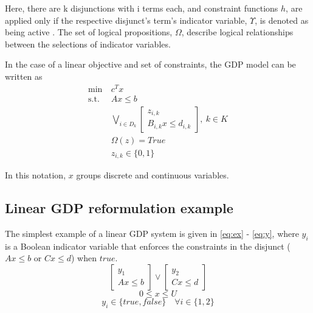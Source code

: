 \documentclass{juliacon}
\begin{document}
Here, there are k disjunctions with i terms each, and constraint functions $h$, are applied only if the respective disjunct's term's indicator variable, $\Upsilon$, is denoted as being active \cite{chen_grossmann_2019}. The set of logical propositions, $\Omega$, describe logical relationships between the selections of indicator variables.
\vskip 6pt

In the case of a linear objective and set of constraints, the GDP model can be written as
\vskip 6pt
\begin{align*}
    \min \ & c^Tx \\
    \text{s.t.} \ &Ax \leq b \\
    &\bigvee_{i \in D_k}
    \begin{bmatrix}
        z_{i,k} \\
       B_{i,k}x \leq d_{i,k}
    \end{bmatrix}, \ k \in K \\
    & \Omega(z) = True \\
    & z_{i,k} \in \{0, 1\}
\end{align*}
\vskip 6pt

In this notation, $x$ groups discrete and continuous variables.
\vskip 6pt

\subsection{Linear GDP reformulation example}
The simplest example of a linear GDP system is given in \eqref{eq:ex} - \eqref{eq:y}, where $y_i$ is a Boolean indicator variable that enforces the constraints in the disjunct ($Ax \le b$ or $Cx \le d$) when $true$.
\vskip 6pt
\begin{equation}
    \label{eq:ex}
    \begin{bmatrix}
    y_1 \\ Ax \leq b
    \end{bmatrix}
    \lor
    \begin{bmatrix}
        y_2 \\ Cx \leq d
    \end{bmatrix}
\end{equation}
\begin{equation}
    \label{eq:x}
    0 \leq x \leq U
\end{equation}
\begin{equation}
    \label{eq:y}
    y_i \in \{true, false\} \quad \forall i\in \{1,2\}
\end{equation}
\vskip 6pt
\end{document}
